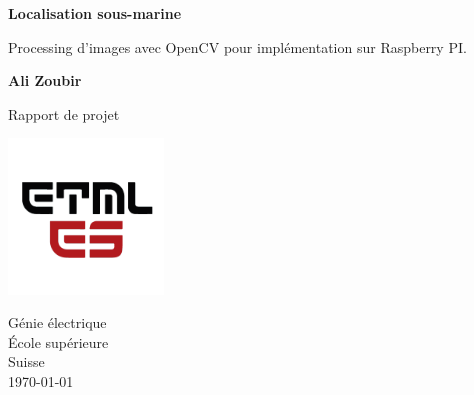 \begin{titlepage}
   \begin{center}
        \vspace*{1cm}
        \LARGE
        {\Huge \textbf{Localisation sous-marine}}
        
        \vspace{0.3cm}
        Processing d'images avec OpenCV pour implémentation sur Raspberry PI.
            
        \vspace{1.5cm}

        \textbf{Ali Zoubir}

        \vfill
            
        Rapport de projet
            
        \vspace{0.8cm}
     
        \includegraphics[width=0.31\textwidth]{ETML-ES-LOGO.png}

        Génie électrique\\
        École supérieure\\
        Suisse\\
        \monthyeardate\today
            
   \end{center}
\end{titlepage}
